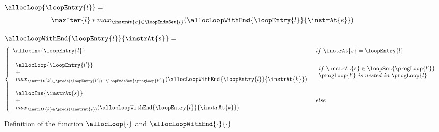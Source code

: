 \begin{figure}[!hbp]
\begin{frameit}
$\allocLoop{\loopEntry{l}} = $
$$ \begin{array}{l}
    \maxIter{l} * max_{ \instrAt{e} \in \loopEndsSet{l}  } (\allocLoopWithEnd{\loopEntry{l}}{\instrAt{e}} )
   \end{array} $$



$\allocLoopWithEnd{\loopEntry{l}}{\instrAt{s}} = $
$$ 
\left\{\begin{array}{ll}

 \allocIns{\loopEntry{l}}  & if \  \instrAt{s} = \loopEntry{l} \\
  & \\
 \begin{array}{l}
           \allocLoop{\loopEntry{l'}} \\
          + \\
      max_{{\scriptsize\instrAt{k} \in \preds(\loopEntry{l'} ) - \loopEndsSet{\progLoop{l'}}}}
       ( \allocLoopWithEnd{\loopEntry{l}}{\instrAt{k}} )
    \end{array} &  \begin{array}{l}
                                        if \  \instrAt{s} \in  \loopSet{\progLoop{l'}} \\
                                          \progLoop{l'} \ is \  nested \ in \ \progLoop{l}
                                    \end{array} \\
  & \\
  \begin{array}{l}
     \allocIns{\instrAt{s}} \\
     + \\
     max_{{\scriptsize\instrAt{k} \in \preds(\instrAt{s} )}}
     ( \allocLoopWithEnd{\loopEntry{l}}{\instrAt{k}} )
                       \end{array} & else \\

\end{array} \right.
$$
 \caption{\sc Definition of the function $\allocLoop{\cdot}$ and  $\allocLoopWithEnd{\cdot}{\cdot}$ }
\label{fig:loopPath}
\end{frameit}
\end{figure}


